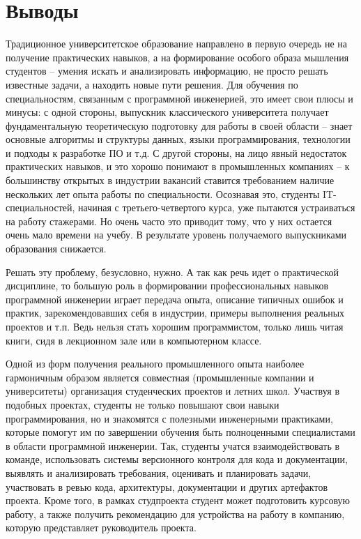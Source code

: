 \documentclass[a5paper]{article}
\begin{document}
\section{Выводы} 

Традиционное университетское образование направлено в первую очередь не на получение практических навыков, а на формирование особого образа мышления студентов -- умения искать и анализировать информацию, не просто решать известные задачи, а находить новые пути решения. Для обучения по специальностям, связанным с программной инженерией, это имеет свои плюсы и минусы: с одной стороны, выпускник классического университета получает фундаментальную теоретическую подготовку для работы в своей области -- знает основные алгоритмы и структуры данных, языки программирования, технологии и подходы к разработке ПО и т.д. С другой стороны, на лицо явный недостаток практических навыков, и это хорошо понимают в промышленных компаниях -- к большинству открытых в индустрии вакансий ставится требованием наличие нескольких лет опыта работы по специальности. Осознавая это, студенты IT-специальностей, начиная с третьего-четвертого курса, уже пытаются устраиваться на работу стажерами. Но очень часто это приводит тому, что у них остается очень мало времени на учебу. В результате уровень получаемого выпускниками образования снижается.

Решать эту проблему, безусловно, нужно. А так как речь идет о практической дисциплине, то большую роль в формировании профессиональных навыков программной инженерии играет передача опыта, описание типичных ошибок и практик, зарекомендовавших себя в индустрии, примеры выполнения реальных проектов и т.п. Ведь нельзя стать хорошим программистом, только лишь читая книги, сидя в лекционном зале или в компьютерном классе. 

Одной из форм получения реального промышленного опыта наиболее гармоничным образом является совместная (промышленные компании и университеты) организация студенческих проектов и летних школ. Участвуя в подобных проектах, студенты не только повышают свои навыки программирования, но и знакомятся с полезными инженерными практиками, которые помогут им по завершении обучения быть полноценными специалистами в области программной инженерии. Так, студенты учатся взаимодействовать в команде, использовать системы версионного контроля для кода и документации, выявлять и анализировать требования, оценивать и планировать задачи, участвовать в ревью кода, архитектуры, документации и других артефактов проекта. Кроме того, в рамках студпроекта студент может подготовить курсовую работу, а также получить рекомендацию для устройства на работу в компанию, которую представляет руководитель проекта. 
\end{document}
